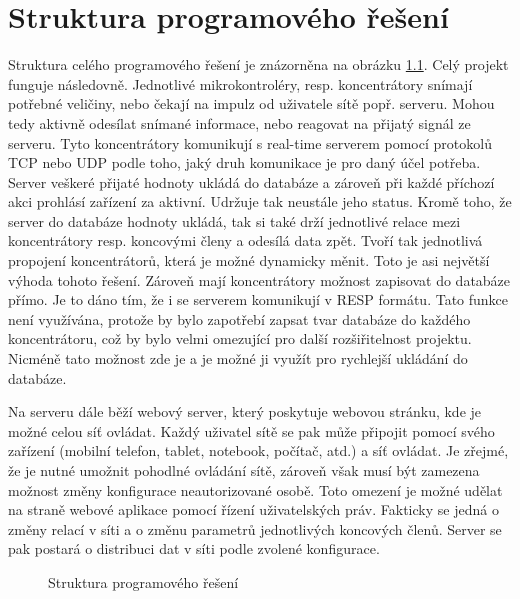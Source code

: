 \chapter{Struktura programového řešení}
Struktura celého programového řešení je znázorněna na obrázku \ref{fig:speedy}. Celý projekt funguje následovně. Jednotlivé mikrokontroléry, resp. koncentrátory snímají potřebné veličiny, nebo čekají na impulz od uživatele sítě popř. serveru. Mohou tedy aktivně odesílat snímané informace, nebo reagovat na přijatý signál ze serveru. Tyto koncentrátory komunikují s real-time serverem pomocí protokolů TCP nebo UDP podle toho, jaký druh komunikace je pro daný účel potřeba. Server veškeré přijaté hodnoty ukládá do databáze a zároveň při každé příchozí akci prohlásí zařízení za aktivní. Udržuje tak neustále jeho status. Kromě toho, že server do databáze hodnoty ukládá, tak si také drží jednotlivé relace mezi koncentrátory resp. koncovými členy a odesílá data zpět. Tvoří tak jednotlivá propojení koncentrátorů, která je možné dynamicky měnit. Toto je asi největší výhoda tohoto řešení. Zároveň mají koncentrátory možnost zapisovat do databáze přímo. Je to dáno tím, že i se serverem komunikují v RESP formátu. Tato funkce není využívána, protože by bylo zapotřebí zapsat tvar databáze do každého koncentrátoru, což by bylo velmi omezující pro další rozšiřitelnost projektu. Nicméně tato možnost zde je a je možné ji využít pro rychlejší ukládání do databáze.

Na serveru dále běží webový server, který poskytuje webovou stránku, kde je možné celou síť ovládat. Každý uživatel sítě se pak může připojit pomocí svého zařízení (mobilní telefon, tablet, notebook, počítač, atd.) a síť ovládat. Je zřejmé, že je nutné umožnit pohodlné ovládání sítě, zároveň však musí být zamezena možnost změny konfigurace neautorizované osobě. Toto omezení je možné udělat na straně webové aplikace pomocí řízení uživatelských práv. Fakticky se jedná o změny relací v síti a o změnu parametrů jednotlivých koncových členů. Server se pak postará o distribuci dat v síti podle zvolené konfigurace.

\begin{figure}[H]
    \centering
	\caption{Struktura programového řešení}
	\label{fig:speedy}
\end{figure}

